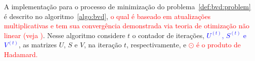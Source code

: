 \documentclass[
    12pt,                %
    oneside,            %
    a4paper,            %
    english,            %
    brazil                %
    ]{abntex2ppgsi}
\begin{document}
%
%
%
%

A implementação para o processo de minimização do problema~\ref{def:bvd:problem} é descrito no algoritmo~\ref{algo:bvd}, \textcolor{red}{o qual é baseado em atualizações multiplicativas e tem sua convergência demonstrada via teoria de otimização não linear (veja \cite{Long2005})}. Nesse algoritmo considere $t$ o contador de iterações, \textcolor{blue}{$U^{(t)}$, $S^{(t)}$ e $V^{(t)}$}, as matrizes $U$, $S$ e $V$, na iteração $t$, respectivamente, e \textcolor{red}{$\odot$ é o produto de Hadamard.}


\end{document}
